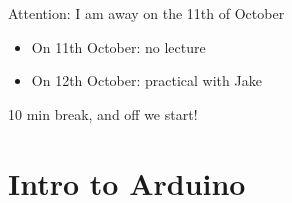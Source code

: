 \documentclass[compress]{beamer}
\makeatletter
\let\beamer@writeslidentry@miniframeson=\beamer@writeslidentry
\def\beamer@writeslidentry@miniframesoff{%
  \expandafter\beamer@ifempty\expandafter{\beamer@framestartpage}{}%
  {%
    \clearpage\beamer@notesactions%
  }
}
\newcommand*{\miniframeson}{\let\beamer@writeslidentry=\beamer@writeslidentry@miniframeson}
\newcommand*{\miniframesoff}{\let\beamer@writeslidentry=\beamer@writeslidentry@miniframesoff}
\makeatother
\begin{document}
\begin{frame}{Attention: I am away on the 11th of October}
    \begin{itemize}
        \item On 11th October: no lecture
        \item On 12th October: practical with Jake
    \end{itemize}
\end{frame}

\miniframesoff
\begin{frame}[plain]
    \begin{center}
        \Large
        10 min break, and off we start!\\[2em]
    \end{center}
\end{frame}
\miniframeson


\section[Arduino]{Intro to Arduino}
\end{document}
